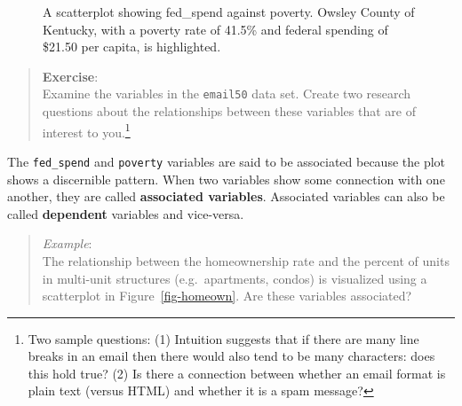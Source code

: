 \documentclass[
  letterpaper,
  DIV=11,
  numbers=noendperiod]{scrreprt}
\begin{document}
\begin{figure}


\caption{\label{fig-pov1}A scatterplot showing fed\_spend against
poverty. Owsley County of Kentucky, with a poverty rate of 41.5\% and
federal spending of \$21.50 per capita, is highlighted.}

\end{figure}%

\begin{quote}
\textbf{Exercise}:\\
Examine the variables in the \texttt{email50} data set. Create two
research questions about the relationships between these variables that
are of interest to you.\footnote{Two sample questions: (1) Intuition
  suggests that if there are many line breaks in an email then there
  would also tend to be many characters: does this hold true? (2) Is
  there a connection between whether an email format is plain text
  (versus HTML) and whether it is a spam message?}
\end{quote}

The \texttt{fed\_spend} and \texttt{poverty} variables are said to be
associated because the plot shows a discernible pattern. When two
variables show some connection with one another, they are called
\textbf{associated variables}. Associated variables can also be called
\textbf{dependent} variables and vice-versa.

\begin{quote}
\emph{Example}:\\
The relationship between the homeownership rate and the percent of units
in multi-unit structures (e.g.~apartments, condos) is visualized using a
scatterplot in Figure~\ref{fig-homeown}. Are these variables associated?
\end{quote}
\end{document}

